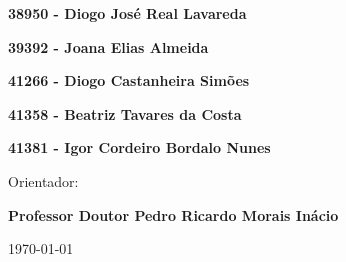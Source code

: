\vspace{0.1cm}
\begin{center}
\begin{large}
\textbf{38950 - Diogo José Real Lavareda}
\end{large}
\end{center}
\begin{center}
\begin{large}
\textbf{39392 - Joana Elias Almeida}
\end{large}
\end{center}
\begin{center}
\begin{large}
\textbf{41266 - Diogo Castanheira Simões}
\end{large}
\end{center}
\begin{center}
\begin{large}
\textbf{41358 - Beatriz Tavares da Costa}
\end{large}
\end{center}
\begin{center}
\begin{large}
\textbf{41381 - Igor Cordeiro Bordalo Nunes}
\end{large}
\end{center}

\vspace{0,3cm}
\begin{center}
\begin{normalsize}
\begin{large}
Orientador:
\end{large}
\end{normalsize}
\end{center}

\vspace{0.1cm}
\begin{center}
\begin{large}
\textbf{Professor Doutor Pedro Ricardo Morais Inácio}
\end{large}
\end{center}



\vspace{0.5cm}
\begin{center}
\begin{normalsize}
\today
\end{normalsize}
\end{center}
